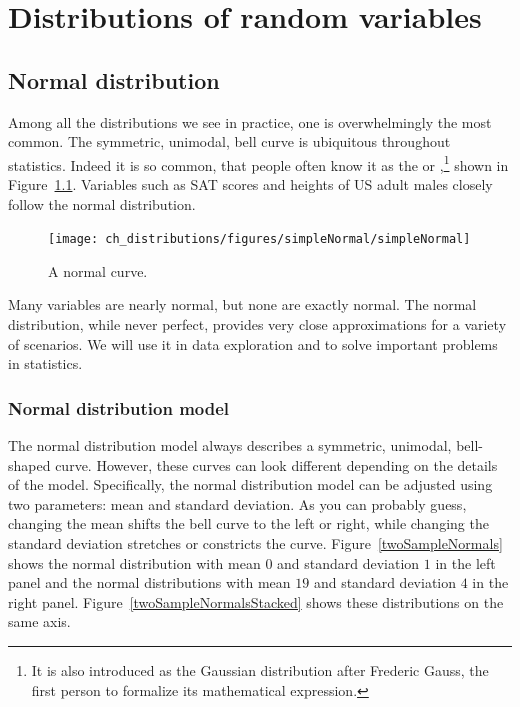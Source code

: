 \chapter{Distributions of random variables}
\label{modeling}


\section[Normal distribution]{Normal distribution }
\label{normalDist}

Among all the distributions we see in practice, one is overwhelmingly the most common. The symmetric, unimodal, bell curve is ubiquitous throughout statistics. Indeed it is so common, that people often know it as the  or ,\footnote{It is also introduced as the Gaussian distribution after Frederic Gauss, the first person to formalize its mathematical expression.} shown in Figure~\ref{simpleNormal}. Variables such as SAT scores and heights of US adult males closely follow the normal distribution.

\begin{figure}
\centering
\texttt{[image: ch\_distributions/figures/simpleNormal/simpleNormal]}
\caption{A normal curve.}
\label{simpleNormal}
\end{figure}

\begin{termBox}{
Many variables are nearly normal, but none are exactly normal. The normal distribution, while never perfect, provides very close approximations for a variety of scenarios. We will use it in data exploration and to solve important problems in statistics.\vspace{0.7mm}}
\end{termBox}

\subsection{Normal distribution model}

The normal distribution model always describes a symmetric, unimodal, bell-shaped curve. However, these curves can look different depending on the details of the model. Specifically, the normal distribution model can be adjusted using two parameters: mean and standard deviation. As you can probably guess, changing the mean shifts the bell curve to the left or right, while changing the standard deviation stretches or constricts the curve. Figure~\ref{twoSampleNormals} shows the normal distribution with mean $0$ and standard deviation $1$ in the left panel and the normal distributions with mean $19$ and standard deviation $4$ in the right panel. Figure~\ref{twoSampleNormalsStacked} shows these distributions on the same axis.

